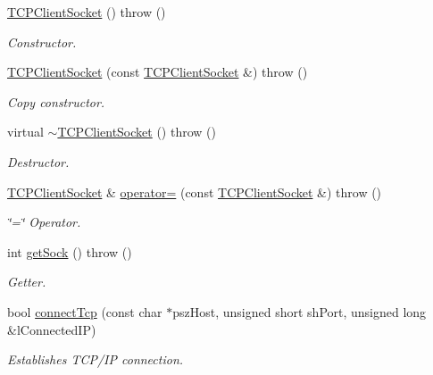 \begin{DoxyCompactItemize}
\item 
\hyperlink{classLSTDAQ_1_1LIB_1_1TCPClientSocket_a7175ecb244181ab5d99cbb399e7ab088}{T\+C\+P\+Client\+Socket} ()  throw ()
\begin{DoxyCompactList}\small\item\em Constructor. \end{DoxyCompactList}\item 
\hyperlink{classLSTDAQ_1_1LIB_1_1TCPClientSocket_a1b0d5399d0ef18b30977ebb7475c4b11}{T\+C\+P\+Client\+Socket} (const \hyperlink{classLSTDAQ_1_1LIB_1_1TCPClientSocket}{T\+C\+P\+Client\+Socket} \&)  throw ()
\begin{DoxyCompactList}\small\item\em Copy constructor. \end{DoxyCompactList}\item 
virtual \hyperlink{classLSTDAQ_1_1LIB_1_1TCPClientSocket_a96bec52de4a6e69c491b6cf089e195ac}{$\sim$\+T\+C\+P\+Client\+Socket} ()  throw ()
\begin{DoxyCompactList}\small\item\em Destructor. \end{DoxyCompactList}\item 
\hyperlink{classLSTDAQ_1_1LIB_1_1TCPClientSocket}{T\+C\+P\+Client\+Socket} \& \hyperlink{classLSTDAQ_1_1LIB_1_1TCPClientSocket_a8bd417c4938eac0a20293fada51ab361}{operator=} (const \hyperlink{classLSTDAQ_1_1LIB_1_1TCPClientSocket}{T\+C\+P\+Client\+Socket} \&)  throw ()
\begin{DoxyCompactList}\small\item\em \char`\"{}=\char`\"{} Operator. \end{DoxyCompactList}\item 
int \hyperlink{classLSTDAQ_1_1LIB_1_1TCPClientSocket_a7356e597b5384977aca499000858e62e}{get\+Sock} ()  throw ()
\begin{DoxyCompactList}\small\item\em Getter. \end{DoxyCompactList}\item 
bool \hyperlink{classLSTDAQ_1_1LIB_1_1TCPClientSocket_aa1cabc1a3e1524013202e70b5b617bb6}{connect\+Tcp} (const char $\ast$psz\+Host, unsigned short sh\+Port, unsigned long \&l\+Connected\+IP)
\begin{DoxyCompactList}\small\item\em Establishes T\+C\+P/\+IP connection. \end{DoxyCompactList}\item 

\end{DoxyCompactItemize}
